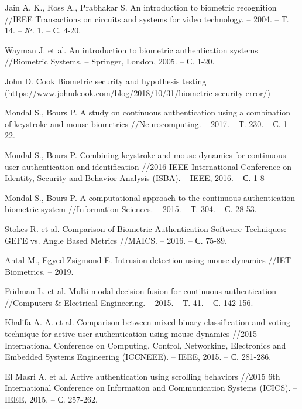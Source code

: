 \documentclass[12pt]{article}
\begin{document}
    \begin{thebibliography}{20}
        Jain A. K., Ross A., Prabhakar S. An introduction to biometric recognition //IEEE Transactions on circuits and systems for video technology. – 2004. – Т. 14. – №. 1. – С. 4-20.

        Wayman J. et al. An introduction to biometric authentication systems //Biometric Systems. – Springer, London, 2005. – С. 1-20.

        John D. Cook Biometric security and hypothesis testing (https://www.johndcook.com/blog/2018/10/31/biometric-security-error/)

        Mondal S., Bours P. A study on continuous authentication using a combination of keystroke and mouse biometrics //Neurocomputing. – 2017. – Т. 230. – С. 1-22.

        Mondal S., Bours P. Combining keystroke and mouse dynamics for continuous user authentication and identification //2016 IEEE International Conference on Identity, Security and Behavior Analysis (ISBA). – IEEE, 2016. – С. 1-8

        Mondal S., Bours P. A computational approach to the continuous authentication biometric system //Information Sciences. – 2015. – Т. 304. – С. 28-53.

        Stokes R. et al. Comparison of Biometric Authentication Software Techniques: GEFE vs. Angle Based Metrics //MAICS. – 2016. – С. 75-89.

        Antal M., Egyed-Zsigmond E. Intrusion detection using mouse dynamics //IET Biometrics. – 2019.

        Fridman L. et al. Multi-modal decision fusion for continuous authentication //Computers & Electrical Engineering. – 2015. – Т. 41. – С. 142-156.

        Khalifa A. A. et al. Comparison between mixed binary classification and voting technique for active user authentication using mouse dynamics //2015 International Conference on Computing, Control, Networking, Electronics and Embedded Systems Engineering (ICCNEEE). – IEEE, 2015. – С. 281-286.

        El Masri A. et al. Active authentication using scrolling behaviors //2015 6th International Conference on Information and Communication Systems (ICICS). – IEEE, 2015. – С. 257-262.


\end{thebibliography}
\end{document}
